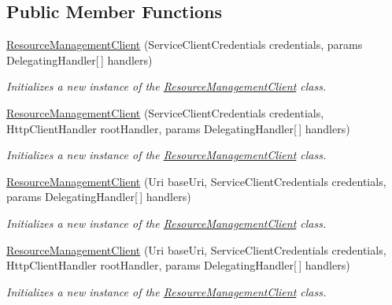 \subsection*{Public Member Functions}
\begin{DoxyCompactItemize}
\item 
\hyperlink{class_microsoft_1_1_azure_1_1_management_1_1_resources_1_1_resource_management_client_a7c3b2493113102041854155b7cd29800}{Resource\+Management\+Client} (Service\+Client\+Credentials credentials, params Delegating\+Handler\mbox{[}$\,$\mbox{]} handlers)
\begin{DoxyCompactList}\small\item\em Initializes a new instance of the \hyperlink{class_microsoft_1_1_azure_1_1_management_1_1_resources_1_1_resource_management_client}{Resource\+Management\+Client} class. \end{DoxyCompactList}\item 
\hyperlink{class_microsoft_1_1_azure_1_1_management_1_1_resources_1_1_resource_management_client_aab315d4d0e5bb057d024a3fe2102a048}{Resource\+Management\+Client} (Service\+Client\+Credentials credentials, Http\+Client\+Handler root\+Handler, params Delegating\+Handler\mbox{[}$\,$\mbox{]} handlers)
\begin{DoxyCompactList}\small\item\em Initializes a new instance of the \hyperlink{class_microsoft_1_1_azure_1_1_management_1_1_resources_1_1_resource_management_client}{Resource\+Management\+Client} class. \end{DoxyCompactList}\item 
\hyperlink{class_microsoft_1_1_azure_1_1_management_1_1_resources_1_1_resource_management_client_a122cb72ec5d69862c51888f2a1e1eb44}{Resource\+Management\+Client} (Uri base\+Uri, Service\+Client\+Credentials credentials, params Delegating\+Handler\mbox{[}$\,$\mbox{]} handlers)
\begin{DoxyCompactList}\small\item\em Initializes a new instance of the \hyperlink{class_microsoft_1_1_azure_1_1_management_1_1_resources_1_1_resource_management_client}{Resource\+Management\+Client} class. \end{DoxyCompactList}\item 
\hyperlink{class_microsoft_1_1_azure_1_1_management_1_1_resources_1_1_resource_management_client_af0299a1bfe5aa8d89754dce429048576}{Resource\+Management\+Client} (Uri base\+Uri, Service\+Client\+Credentials credentials, Http\+Client\+Handler root\+Handler, params Delegating\+Handler\mbox{[}$\,$\mbox{]} handlers)
\begin{DoxyCompactList}\small\item\em Initializes a new instance of the \hyperlink{class_microsoft_1_1_azure_1_1_management_1_1_resources_1_1_resource_management_client}{Resource\+Management\+Client} class. \end{DoxyCompactList}\end{DoxyCompactItemize}
